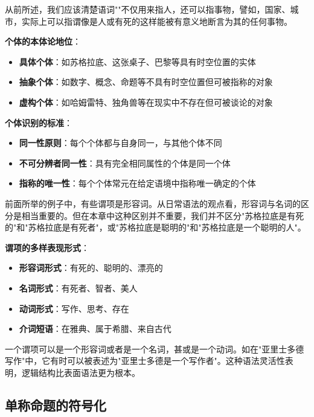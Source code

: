 \begin{theorembox}[title=个体概念的哲学分析]
从前所述，我们应该清楚语词""不仅用来指人，还可以指事物，譬如，国家、城市，实际上可以指谓像是人或有死的这样能被有意义地断言为其的任何事物。

\textbf{个体的本体论地位}：
\begin{itemize}
\item \textbf{具体个体}：如苏格拉底、这张桌子、巴黎等具有时空位置的实体
\item \textbf{抽象个体}：如数字、概念、命题等不具有时空位置但可被指称的对象
\item \textbf{虚构个体}：如哈姆雷特、独角兽等在现实中不存在但可被谈论的对象
\end{itemize}

\textbf{个体识别的标准}：
\begin{itemize}
\item \textbf{同一性原则}：每个个体都与自身同一，与其他个体不同
\item \textbf{不可分辨者同一性}：具有完全相同属性的个体是同一个体
\item \textbf{指称的唯一性}：每个个体常元在给定语境中指称唯一确定的个体
\end{itemize}
\end{theorembox}

\begin{examplebox}[title=谓项的语法灵活性]
前面所举的例子中，有些谓项是形容词。从日常语法的观点看，形容词与名词的区分是相当重要的。但在本章中这种区别并不重要，我们并不区分"苏格拉底是有死的"和"苏格拉底是有死者"，或"苏格拉底是聪明的"和"苏格拉底是一个聪明的人"。

\textbf{谓项的多样表现形式}：
\begin{itemize}
\item \textbf{形容词形式}：有死的、聪明的、漂亮的
\item \textbf{名词形式}：有死者、智者、美人
\item \textbf{动词形式}：写作、思考、存在
\item \textbf{介词短语}：在雅典、属于希腊、来自古代
\end{itemize}

一个谓项可以是一个形容词或者是一个名词，甚或是一个动词。如在"亚里士多德写作"中，它有时可以被表述为"亚里士多德是一个写作者"。这种语法灵活性表明，逻辑结构比表面语法更为根本。
\end{examplebox}

\subsection{单称命题的符号化}

